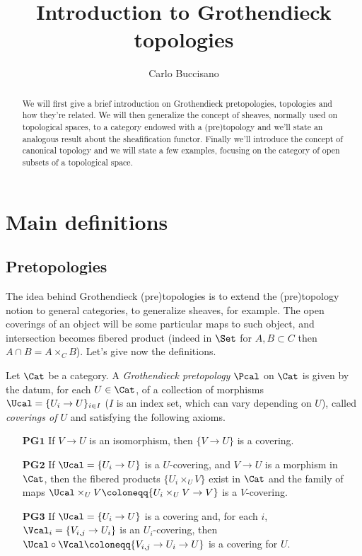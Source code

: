 \documentclass[a4paper]{article}
\author{Carlo Buccisano}
\title{Introduction to Grothendieck topologies}
\begin{document}
    \maketitle
    \begin{abstract}
        We will first give a brief introduction on Grothendieck pretopologies, topologies and how they're related. We will then generalize the concept of sheaves, normally used on topological spaces, to a category endowed with a (pre)topology and we'll state an analogous result about the sheafification functor. Finally we'll introduce the concept of canonical topology and we will state a few examples, focusing on the category of open subsets of a topological space.
    \end{abstract}
    \section{Main definitions}
        \subsection{Pretopologies}
            The idea behind Grothendieck (pre)topologies is to extend the (pre)topology notion to general categories, to generalize sheaves, for example. The open coverings of an object will be some particular maps to such object, and intersection becomes fibered product (indeed in $\Set$ for $A, B \subset C$ then $A \cap B = A \times_C B$).
            Let's give now the definitions.
            \begin{defn}
                Let $\Cat$ be a category. A \emph{Grothendieck pretopology} $\Pcal$ on $\Cat$ is given by the datum, for each $U \in \Cat$, of a collection of morphisms $\Ucal = \{U_i \to U\}_{i \in I}$ ($I$ is an index set, which can vary depending on $U$), called \emph{coverings of $U$} and satisfying the following axioms.
                \begin{enumerate}
                    \item[$\mathbf{PG1}$] If $V \to U$ is an isomorphism, then $\{V \to U\}$ is a covering.
                    \item[$\mathbf{PG2}$] If $\Ucal = \{U_i \to U\}$ is a $U$-covering, and $V \to U$ is a morphism in $\Cat$, then the fibered products $\{U_i \times_U V\}$ exist in $\Cat $ and the family of maps $\Ucal \times_U V \coloneqq \{U_i \times_U V \to V\}$ is a $V$-covering.
                    \item[$\mathbf{PG3}$] If $\Ucal = \{U_i \to U\}$ is a covering and, for each $i$, $\Vcal_i = \{V_{i,j} \to U_i\}$ is an $U_i$-covering, then $\Ucal \circ \Vcal \coloneqq \{V_{i,j} \to U_i \to U\}$ is a covering for $U$.
                \end{enumerate}
            \end{defn}
\end{document}
